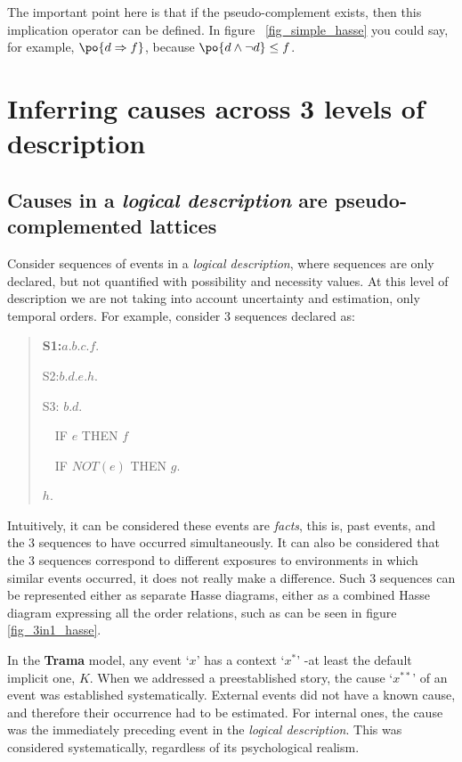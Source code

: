 \documentclass[
		twoside,openright,titlepage,numbers=noenddot,manychapters,
		headinclude,%
                footinclude=false,cleardoublepage=empty,
                BCOR=5mm,
		fontsize=11pt, %
                 enabledeprecatedfontcommands]{scrreprt}
\begin{document}
The important point here is that  if the pseudo-complement exists, then this implication operator can be defined. In figure 
~\ref{fig_simple_hasse} you could say, for example, $ \po{d \Rightarrow f  }$, because $\po{ d \wedge \neg d } \leq f $. 



\section{Inferring causes across 3 levels of description}
\label{cause_finding}
\subsection{Causes in a \emph{logical description} are pseudo-complemented lattices}
Consider sequences of events in a \emph{logical description}, where sequences are only declared, but not quantified with possibility and necessity values. At this level of description we are not taking into account uncertainty and estimation, only temporal orders.  For example, consider 3 sequences declared as: 
\begin{quote}
{\bf
S1:$a.b.c.f.$

S2:$b. d.e.h.$

S3: $b.d. $

\ \ IF $e$ THEN $f$ 

\ \ IF $NOT(e)$ THEN $g$.

$ h$.
}
\end{quote}



Intuitively, it can be considered these events are \emph{facts}, this is, past events, and the 3 sequences to have occurred simultaneously. It can also be considered that the 3 sequences correspond to different exposures to environments in which similar events occurred, it does not really make a difference. Such 3 sequences can be represented either as separate Hasse diagrams, either as a combined Hasse diagram expressing all the order relations, such as can be seen in figure \ref{fig_3in1_hasse}. 



In the \textbf{Trama} model, any event `$x$' has a context `$x^*$' -at least the default implicit one, $K$. When we addressed a preestablished story, the cause `$x^{**}$' of an event was established systematically.  External events did not have a known cause, and therefore their occurrence had to be estimated. For internal ones, the cause was the immediately preceding event in the \emph{logical description}. This was considered systematically, regardless of its psychological realism.
\end{document}
